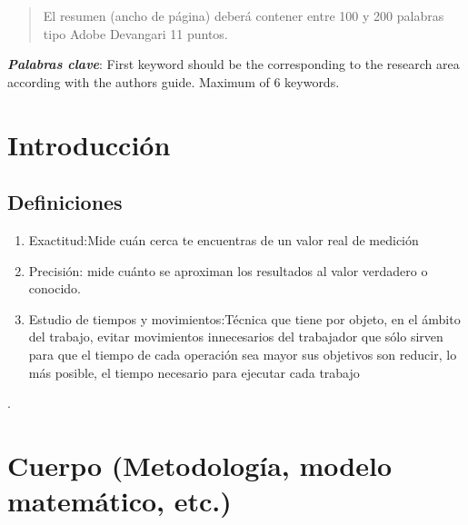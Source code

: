     
    
    \begin{abstract}
    \noindent 
    El resumen (ancho de página) deberá contener entre 100 y 200 palabras tipo Adobe Devangari 11 puntos.
    
    \end{abstract}
    \textbf{\textit{Palabras clave}}: {First keyword should be the corresponding to the research area according with the authors guide. Maximum of 6 keywords.}
    
    \section{Introducción}
    
    \subsection{Definiciones}
    
    \begin{enumerate}
        \item Exactitud:Mide cuán cerca te encuentras de un valor real de medición
        \item Precisión: mide cuánto se aproximan los resultados al valor verdadero o conocido.
        \item Estudio de  tiempos y movimientos:Técnica que tiene por objeto, en el ámbito del trabajo, evitar movimientos innecesarios del trabajador que sólo sirven para que el tiempo de cada operación sea mayor sus objetivos son reducir, lo más posible, el tiempo necesario para ejecutar cada trabajo
    \end{enumerate}.
    
    \section{Cuerpo (Metodología, modelo matemático, etc.)}
    
